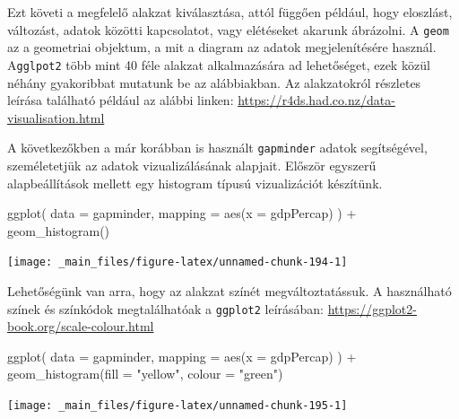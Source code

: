 \documentclass[
]{book}
\newenvironment{Shaded}{\begin{snugshade}}{\end{snugshade}}
\newcommand{\AttributeTok}[1]{\textcolor[rgb]{0.77,0.63,0.00}{#1}}
\newcommand{\FunctionTok}[1]{\textcolor[rgb]{0.00,0.00,0.00}{#1}}
\newcommand{\NormalTok}[1]{#1}
\newcommand{\SpecialCharTok}[1]{\textcolor[rgb]{0.00,0.00,0.00}{#1}}
\newcommand{\StringTok}[1]{\textcolor[rgb]{0.31,0.60,0.02}{#1}}
\begin{document}
Ezt követi a megfelelő alakzat kiválasztása, attól függően például, hogy
eloszlást, változást, adatok közötti kapcsolatot, vagy elétéseket
akarunk ábrázolni. A \texttt{geom} az a geometriai objektum, a mit a
diagram az adatok megjelenítésére használ. A\texttt{gglpot2} több mint
40 féle alakzat alkalmazására ad lehetőséget, ezek közül néhány
gyakoribbat mutatunk be az alábbiakban. Az alakzatokról részletes
leírása található például az alábbi linken:
\url{https://r4ds.had.co.nz/data-visualisation.html}

A következőkben a már korábban is használt \texttt{gapminder} adatok
segítségével, személetetjük az adatok vizualizálásának alapjait. Először
egyszerű alapbeállítások mellett egy histogram típusú vizualizációt
készítünk.

\begin{Shaded}
\begin{Highlighting}[]
\FunctionTok{ggplot}\NormalTok{(}
  \AttributeTok{data =}\NormalTok{ gapminder, }
  \AttributeTok{mapping =} \FunctionTok{aes}\NormalTok{(}\AttributeTok{x =}\NormalTok{ gdpPercap)}
\NormalTok{) }\SpecialCharTok{+} 
  \FunctionTok{geom\_histogram}\NormalTok{() }
\end{Highlighting}
\end{Shaded}

\begin{center}\texttt{[image: \_main\_files/figure-latex/unnamed-chunk-194-1]} \end{center}

Lehetőségünk van arra, hogy az alakzat színét megváltoztatássuk. A
használható színek és színkódok megtalálhatóak a \texttt{ggplot2}
leírásában: \url{https://ggplot2-book.org/scale-colour.html}

\begin{Shaded}
\begin{Highlighting}[]
\FunctionTok{ggplot}\NormalTok{(}
  \AttributeTok{data =}\NormalTok{ gapminder,}
  \AttributeTok{mapping =} \FunctionTok{aes}\NormalTok{(}\AttributeTok{x =}\NormalTok{ gdpPercap)}
\NormalTok{) }\SpecialCharTok{+}
  \FunctionTok{geom\_histogram}\NormalTok{(}\AttributeTok{fill =} \StringTok{"yellow"}\NormalTok{, }\AttributeTok{colour =} \StringTok{"green"}\NormalTok{) }
\end{Highlighting}
\end{Shaded}

\begin{center}\texttt{[image: \_main\_files/figure-latex/unnamed-chunk-195-1]} \end{center}
\end{document}
